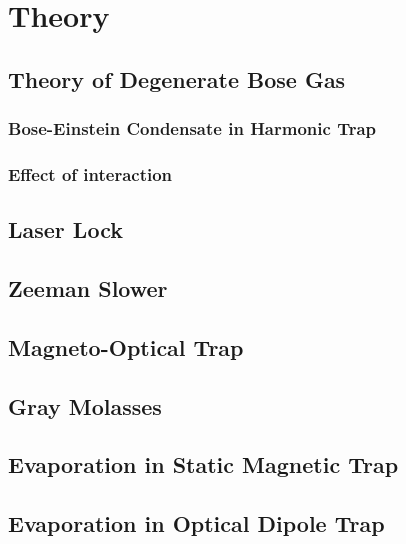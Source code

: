 \chapter{Theory}

\section{Theory of Degenerate Bose Gas}\label{ch1:bec}
\subsection{Bose-Einstein Condensate in Harmonic Trap}
\subsection{Effect of interaction}

\section{Laser Lock}

\section{Zeeman Slower}

\section{Magneto-Optical Trap}

\section{Gray Molasses}

\section{Evaporation in Static Magnetic Trap}

\section{Evaporation in Optical Dipole Trap}
